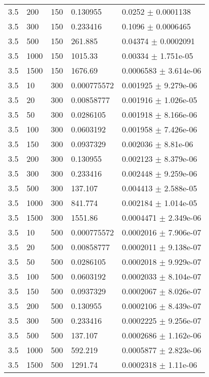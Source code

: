 \begin{longtable}{lllll}
 3.5 &   200 &   150 & 0.130955 &   0.0252 $\pm$ 0.0001138 \\
 3.5 &   300 &   150 & 0.233416 &   0.1096 $\pm$ 0.0006465 \\
 3.5 &   500 &   150 &  261.885 &  0.04374 $\pm$ 0.0002091 \\
 3.5 &  1000 &   150 &  1015.33 &  0.00334 $\pm$ 1.751e-05 \\
 3.5 &  1500 &   150 &  1676.69 & 0.0006583 $\pm$ 3.614e-06 \\
 3.5 &    10 &   300 & 0.000775572 & 0.001925 $\pm$ 9.279e-06 \\
 3.5 &    20 &   300 & 0.00858777 & 0.001916 $\pm$ 1.026e-05 \\
 3.5 &    50 &   300 & 0.0286105 & 0.001918 $\pm$ 8.166e-06 \\
 3.5 &   100 &   300 & 0.0603192 & 0.001958 $\pm$ 7.426e-06 \\
 3.5 &   150 &   300 & 0.0937329 & 0.002036 $\pm$ 8.81e-06 \\
 3.5 &   200 &   300 & 0.130955 & 0.002123 $\pm$ 8.379e-06 \\
 3.5 &   300 &   300 & 0.233416 & 0.002448 $\pm$ 9.259e-06 \\
 3.5 &   500 &   300 &  137.107 & 0.004413 $\pm$ 2.588e-05 \\
 3.5 &  1000 &   300 &  841.774 & 0.002184 $\pm$ 1.014e-05 \\
 3.5 &  1500 &   300 &  1551.86 & 0.0004471 $\pm$ 2.349e-06 \\
 3.5 &    10 &   500 & 0.000775572 & 0.0002016 $\pm$ 7.906e-07 \\
 3.5 &    20 &   500 & 0.00858777 & 0.0002011 $\pm$ 9.138e-07 \\
 3.5 &    50 &   500 & 0.0286105 & 0.0002018 $\pm$ 9.929e-07 \\
 3.5 &   100 &   500 & 0.0603192 & 0.0002033 $\pm$ 8.104e-07 \\
 3.5 &   150 &   500 & 0.0937329 & 0.0002067 $\pm$ 8.026e-07 \\
 3.5 &   200 &   500 & 0.130955 & 0.0002106 $\pm$ 8.439e-07 \\
 3.5 &   300 &   500 & 0.233416 & 0.0002225 $\pm$ 9.256e-07 \\
 3.5 &   500 &   500 &  137.107 & 0.0002686 $\pm$ 1.162e-06 \\
 3.5 &  1000 &   500 &  592.219 & 0.0005877 $\pm$ 2.823e-06 \\
 3.5 &  1500 &   500 &  1291.74 & 0.0002318 $\pm$ 1.11e-06 \\

\end{longtable}
